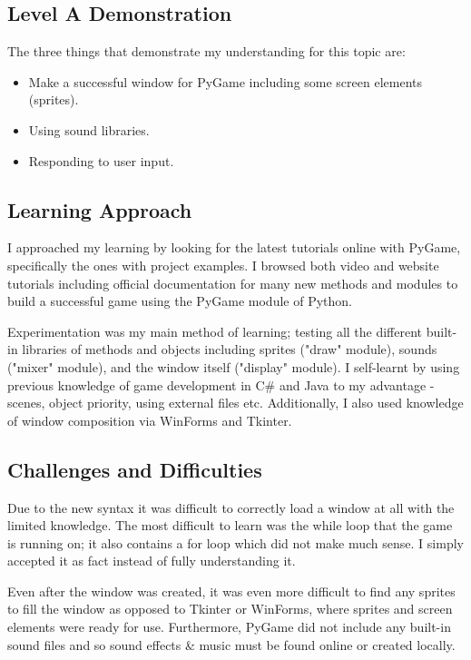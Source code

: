 \documentclass[a4paper, 11pt]{report}
\begin{document}
\subsection{Level A Demonstration}
The three things that demonstrate my understanding for this topic are:
\begin{itemize}
	\item Make a successful window for PyGame including some screen elements (sprites).
	\item Using sound libraries.
	\item Responding to user input.
\end{itemize}

\subsection{Learning Approach}
I approached my learning by looking for the latest tutorials online with PyGame, specifically the ones with project examples. I browsed both video and website tutorials including official documentation for many new methods and modules to build a successful game using the PyGame module of Python.

Experimentation was my main method of learning; testing all the different built-in libraries of methods and objects including sprites ("draw" module), sounds ("mixer" module), and the window itself ("display" module). I self-learnt by using previous knowledge of game development in C\# and Java to my advantage - scenes, object priority, using external files etc. Additionally, I also used knowledge of window composition via WinForms and Tkinter.

\subsection{Challenges and Difficulties}
Due to the new syntax it was difficult to correctly load a window at all with the limited knowledge. The most difficult to learn was the while loop that the game is running on; it also contains a for loop which did not make much sense. I simply accepted it as fact instead of fully understanding it.

Even after the window was created, it was even more difficult to find any sprites to fill the window as opposed to Tkinter or WinForms, where sprites and screen elements were ready for use. Furthermore, PyGame did not include any built-in sound files and so sound effects \& music must be found online or created locally.
\end{document}
